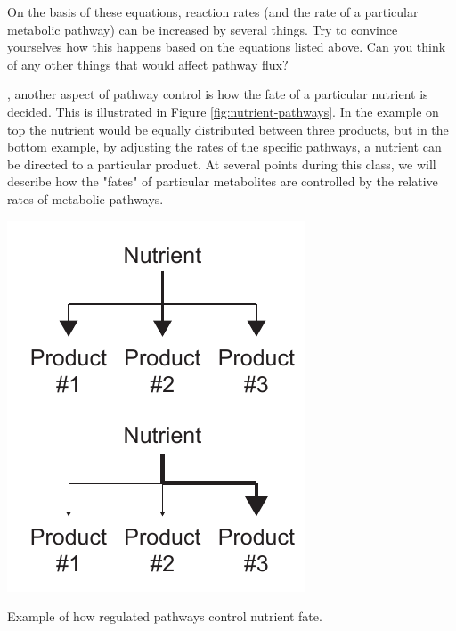 \documentclass{tufte-handout}
\begin{document}
On the basis of these equations, reaction rates (and the rate of a particular metabolic pathway) can be increased by several things.  Try to convince yourselves how this happens based on the equations listed above. Can you think of any other things that would affect pathway flux? 

, another aspect of pathway control is how the fate of a particular nutrient is decided.  This is illustrated in Figure \ref{fig:nutrient-pathways}.  In the example on top the nutrient would be equally distributed between three products, but in the bottom example, by adjusting the rates of the specific pathways, a nutrient can be directed to a particular product.  At several points during this class, we will describe how the "fates" of particular metabolites are controlled by the relative rates of metabolic pathways.

\begin{marginfigure}
\includegraphics[width=0.75\marginparwidth]{figures/nutrient-pathways.pdf}\
\caption{Example of how regulated pathways control nutrient fate.}
\label{fig:nutrient-pathways}
\end{marginfigure}
\end{document}
